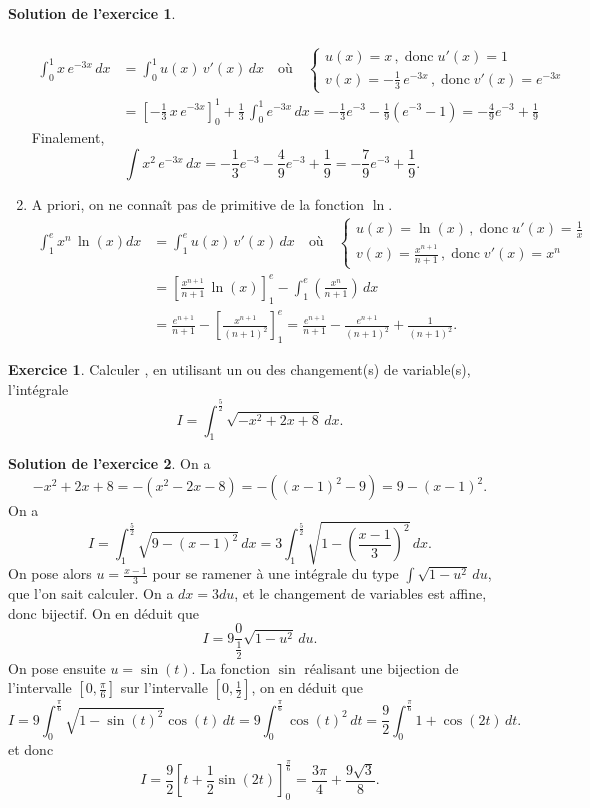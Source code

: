 \documentclass[a4paper, 11pt,openany]{article}%
\theoremstyle{plain}
\theoremstyle{definition}
\newtheorem{exo}{Exercice}
\newtheorem{sol}{Solution de l'exercice}
\theoremstyle{remark}
\begin{document}
\begin{sol}
\begin{enumerate}
\begin{align*}
\end{align*}
\begin{align*}\int_0^1 x\,e^{-3x}\, dx &= \int_0^1 u(x)\, v'(x)\, dx \quad \text{où}\quad \begin{cases}
 u(x)=x\,,\;\text{donc}\; u'(x)=1\\
 v(x)=-\frac{1}{3}\,e^{-3x}\,,\;\text{donc}\;v'(x)=e^{-3x}\end{cases}\\
&= \left[-\frac{1}{3}\,x\,e^{-3x} \right]_0^1+\frac{1}{3}\,\int_0^1 e^{-3x}\,dx
=-\frac{1}{3}e^{-3} -\frac{1}{9}(e^{-3} - 1) = -\frac{4}{9}e^{-3} +\frac{1}{9}
\end{align*}
Finalement, 
\[
\int x^2\,e^{-3x}\, dx = - \frac{1}{3}e^{-3} -\frac{4}{9}e^{-3} +\frac{1}{9} = - \frac{7}{9}e^{-3} + \frac{1}{9}.\]
\item  A priori, on ne connaît pas de primitive de la fonction $\ln$.
\begin{align*}\int_1^e x^n\,\ln(x) dx &= \int_1^e u(x)\, v'(x)\, dx \quad \text{où}\quad \begin{cases}
 u(x)=\ln(x)\,,\;\text{donc}\; u'(x)=\frac{1}{x}\\
 v(x)=\frac{x^{n+1}}{n+1}\,,\;\text{donc}\;v'(x)=x^n\end{cases}\\
&= \left[\frac{x^{n+1}}{n+1}\,\ln(x)\right]_1^e-\int_1^e \left(\frac{x^{n}}{n+1}\right)\,dx\\
&= \frac{e^{n+1}}{n+1} - \left[\frac{x^{n+1}}{(n+1)^2}\right]_1^e
=\frac{e^{n+1}}{n+1} - \frac{e^{n+1}}{(n+1)^2}+ \frac{1}{(n+1)^2}.
\end{align*}
\end{enumerate}
\end{sol}


\begin{exo}
Calculer , en utilisant un ou des changement(s) de variable(s), l'intégrale
\[ I = \int_1^{\frac{5}{2}} \sqrt{-x^2 + 2x + 8} \, dx.\]
\end{exo}

\begin{sol}
On a
\[ - x^2 + 2x + 8 = -(x^2 - 2x - 8) = -((x-1)^2 - 9) = 9 - (x-1)^2.\]
 On a 
 \[ I= \int_1^{\frac{5}{2}} \sqrt{9- (x-1)^2} \, dx = 3 \int_{1}^{\frac{5}{2}} \sqrt{1 - \left( \frac{x-1}{3} \right)^2} \, dx.\]
 On pose alors $u=\frac{x-1}{3}$ pour se ramener à une intégrale du type $\int \sqrt{1 - u^2}\, du$, que l'on sait calculer. On a $dx=3du$, et le changement de variables est affine, donc bijectif. On en déduit que 
 \[ I=9 \frac{0}{\frac{1}{2}} \sqrt{1-u^2} \, du.\]
 On pose ensuite $u=\sin(t)$. La fonction $\sin$ réalisant une bijection de l'intervalle $\left[0,\frac{\pi}{6} \right]$ sur l'intervalle $\left[0, \frac{1}{2} \right]$, on en déduit que 
 \[ I=9 \int_0^{\frac{\pi}{6}} \sqrt{1-\sin(t)^2} \cos(t) \, dt = 9\int_0^{\frac{\pi}{6}} \cos(t)^2 \, dt = \frac{9}{2} \int_0^{\frac{\pi}{6}} 1+\cos(2t) \, dt.\]
 et donc
 \[ I = \frac{9}{2} \left[ t + \frac{1}{2} \sin(2t) \right]_0^{\frac{\pi}{6}} = \frac{3 \pi}{4} + \frac{9 \sqrt{3}}{8}.\]
\end{sol}
\end{document}
